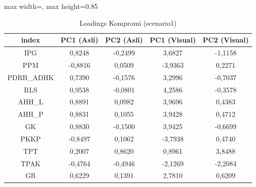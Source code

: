 \begin{table}[H]
\centering
\caption{Loadings Kompromi (scenario1)} \label{tab:app1loadings}
\begin{adjustbox}{max width=\textwidth, max height=0.85\textheight}
\begin{tabular}{|c|c|c|c|c|}
\hline
\textbf{index} & \textbf{PC1 (Asli)} & \textbf{PC2 (Asli)} & \textbf{PC1 (Visual)} & \textbf{PC2 (Visual)} \\
\hline
IPG & 0,8248 & -0,2499 & 3,6827 & -1,1158 \\
PPM & -0,8816 & 0,0509 & -3,9363 & 0,2271 \\
PDRB\_ADHK & 0,7390 & -0,1576 & 3,2996 & -0,7037 \\
RLS & 0,9538 & -0,0801 & 4,2586 & -0,3578 \\
AHH\_L & 0,8891 & 0,0982 & 3,9696 & 0,4383 \\
AHH\_P & 0,8831 & 0,1055 & 3,9428 & 0,4712 \\
GK & 0,8830 & -0,1500 & 3,9425 & -0,6699 \\
PKKP & -0,8497 & 0,1062 & -3,7938 & 0,4740 \\
TPT & 0,2007 & 0,8620 & 0,8961 & 3,8488 \\
TPAK & -0,4764 & -0,4946 & -2,1269 & -2,2084 \\
GR & 0,6229 & 0,1391 & 2,7810 & 0,6209 \\
\hline
\end{tabular}
\end{adjustbox}
\end{table}